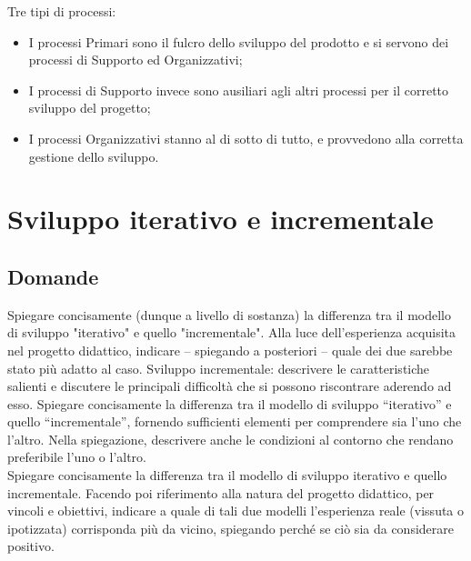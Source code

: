 Tre tipi di processi:
\begin{itemize}
\item I processi Primari sono il fulcro dello sviluppo del prodotto e si servono dei processi di Supporto ed Organizzativi;
\item I processi di Supporto invece sono ausiliari agli altri processi per il corretto sviluppo del progetto;
\item I processi Organizzativi stanno al di sotto di tutto, e provvedono alla corretta gestione dello sviluppo.
\end{itemize}

\section{Sviluppo iterativo e incrementale}

\subsection*{Domande}
Spiegare concisamente (dunque a livello di sostanza) la differenza tra il modello di sviluppo "iterativo" e quello "incrementale". Alla luce dell'esperienza acquisita nel progetto didattico, indicare – spiegando a posteriori – quale dei due sarebbe stato più adatto al caso.
Sviluppo incrementale: descrivere le caratteristiche salienti e discutere le principali difficoltà che si possono riscontrare aderendo ad esso.
Spiegare concisamente la differenza tra il modello di sviluppo “iterativo” e quello “incrementale”, fornendo sufficienti elementi per comprendere sia l'uno che l'altro. Nella spiegazione, descrivere anche le condizioni al contorno che rendano preferibile l'uno o l'altro. \\

Spiegare concisamente la differenza tra il modello di sviluppo iterativo e quello incrementale. Facendo poi riferimento alla natura del progetto didattico, per vincoli e obiettivi, indicare a quale di tali due modelli l'esperienza reale (vissuta o ipotizzata) corrisponda più da vicino, spiegando perché se ciò sia da considerare positivo. \\

